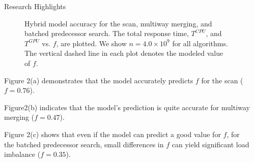 \documentclass[final]{beamer}
\newlength{\sepwidth}
\newlength{\colwidth}
\newcommand{\separatorcolumn}{\begin{column}{\sepwidth}\end{column}}
\begin{document}
\begin{frame}[t]
\begin{columns}[t]
\separatorcolumn

\begin{column}{\colwidth}

  \begin{block}{Research Highlights}
\begin{figure}[htp]
\centering
{}


 \caption{Hybrid model accuracy for the scan, multiway merging, and batched predecessor search. The total response time, $T^{CPU}$, and $T^{GPU}$ vs. $f$, are plotted. We show $n=4.0\times10^9$ for all algorithms. The vertical dashed line in each plot denotes the modeled value of $f$.}

 \label{fig:time_vs_f}
\end{figure}

\begin{description}[font=$\bullet$~\normalfont\scshape\color{red!50!black}]
\item Figure 2(a) demonstrates that the model accurately predicts $f$ for the scan ($f=0.76$).
\item  Figure2(b) indicates that the model's prediction is quite accurate for multiway merging ($f=0.47$).
\item  Figure 2(c) shows that even if the model can predict a good value for $f$, for the batched predecessor search, small differences in $f$ can yield significant load imbalance ($f=0.35$). 
\end{description}


\end{block}
\end{column}
\end{columns}
\end{frame}
\end{document}
